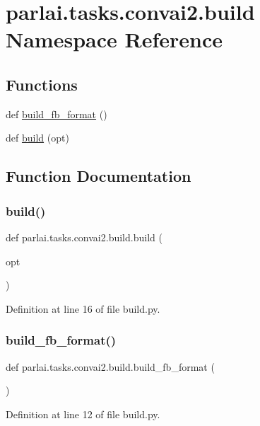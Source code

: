 \hypertarget{namespaceparlai_1_1tasks_1_1convai2_1_1build}{}\section{parlai.\+tasks.\+convai2.\+build Namespace Reference}
\label{namespaceparlai_1_1tasks_1_1convai2_1_1build}
\subsection*{Functions}
\begin{DoxyCompactItemize}
\item 
def \hyperlink{namespaceparlai_1_1tasks_1_1convai2_1_1build_aac893ef8d5159621bc7086097270f7c1}{build\+\_\+fb\+\_\+format} ()
\item 
def \hyperlink{namespaceparlai_1_1tasks_1_1convai2_1_1build_a2faeed65bdc0f4793f8a1f8cb840ec74}{build} (opt)
\end{DoxyCompactItemize}


\subsection{Function Documentation}
\mbox{\label{namespaceparlai_1_1tasks_1_1convai2_1_1build_a2faeed65bdc0f4793f8a1f8cb840ec74}} 
\subsubsection{\texorpdfstring{build()}{build()}}
{\footnotesize\ttfamily def parlai.\+tasks.\+convai2.\+build.\+build (\begin{DoxyParamCaption}\item[{}]{opt }\end{DoxyParamCaption})}



Definition at line 16 of file build.\+py.

\mbox{\label{namespaceparlai_1_1tasks_1_1convai2_1_1build_aac893ef8d5159621bc7086097270f7c1}} 
\subsubsection{\texorpdfstring{build\+\_\+fb\+\_\+format()}{build\_fb\_format()}}
{\footnotesize\ttfamily def parlai.\+tasks.\+convai2.\+build.\+build\+\_\+fb\+\_\+format (\begin{DoxyParamCaption}{ }\end{DoxyParamCaption})}



Definition at line 12 of file build.\+py.

